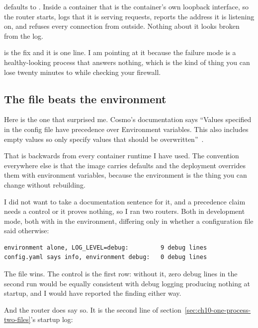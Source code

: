 %
 defaults to . Inside a container that
is the container's own loopback interface, so the router starts, logs that it
is serving requests, reports the address it is listening on, and refuses every
connection from outside. Nothing about it looks broken from the log.

 is the fix and it is one line. I am pointing at it because
the failure mode is a healthy-looking process that answers nothing, which is
the kind of thing you can lose twenty minutes to while checking your firewall.

\subsection*{The file beats the environment}

%
Here is the one that surprised me. Cosmo's documentation says
\enquote{Values specified in the config file have precedence over Environment
variables. This also includes empty values so only specify values that should be
overwritten}~\autocite{cosmo2026routerconfiguration}.

That is backwards from every container runtime I have used. The convention
everywhere else is that the image carries defaults and the deployment overrides
them with environment variables, because the environment is the thing you can
change without rebuilding.

I did not want to take a documentation sentence for it, and a precedence claim
needs a control or it proves nothing, so I ran two routers. Both in development
mode, both with  in the environment, differing only in
whether a configuration file said otherwise:

\begin{verbatim}
environment alone, LOG_LEVEL=debug:         9 debug lines
config.yaml says info, environment debug:   0 debug lines
\end{verbatim}

The file wins. The control is the first row: without it, zero debug lines in
the second run would be equally consistent with debug logging producing nothing
at startup, and I would have reported the finding either way.

%
And the router does say so. It is the second line of
section~\ref{sec:ch10-one-process-two-files}'s startup log:

